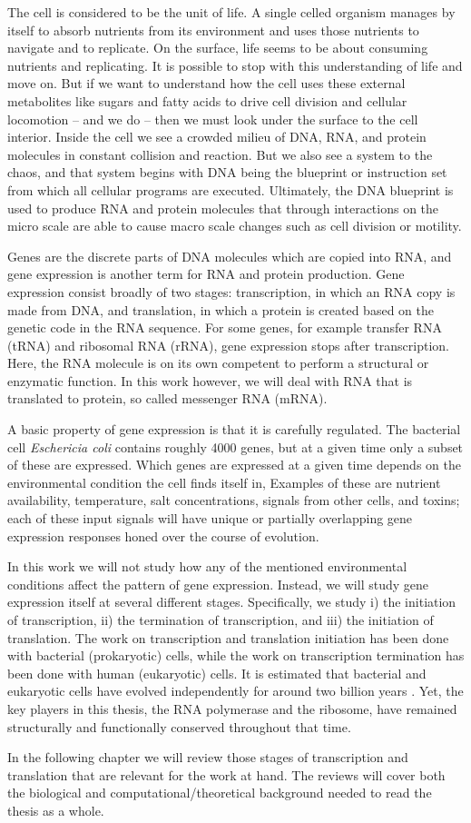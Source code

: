 %

The cell is considered to be the unit of life. A single celled organism manages
by itself to absorb nutrients from its environment and uses those nutrients to
navigate and to replicate. On the surface, life seems to be about
consuming nutrients and replicating. It is possible to stop with this
understanding of life and move on. But if we want to understand how the cell
uses these external metabolites like sugars and fatty acids to drive cell
division and cellular locomotion -- and we do -- then we must look under the
surface to the cell interior. Inside the cell we see a crowded milieu of DNA,
RNA, and protein molecules in constant collision and reaction. But we also see
a system to the chaos, and that system begins with DNA being the blueprint or
instruction set from which all cellular programs are executed. Ultimately, the
DNA blueprint is used to produce RNA and protein molecules that through
interactions on the micro scale are able to cause macro scale changes such as
cell division or motility.

Genes are the discrete parts of DNA molecules which are copied into RNA, and gene
expression is another term for RNA and protein production. Gene expression
consist broadly of two stages: transcription, in which an RNA copy is made
from DNA, and translation, in which a protein is created based on
the genetic code in the RNA sequence. For some genes, for example transfer RNA
(tRNA) and ribosomal RNA (rRNA), gene expression stops after transcription.
Here, the RNA molecule is on its own competent to perform a structural or
enzymatic function. In this work however, we will deal with RNA that is
translated to protein, so called messenger RNA (mRNA).

A basic property of gene expression is that it is carefully regulated. The
bacterial cell \textit{Eschericia coli} contains roughly 4000 genes, but at a
given time only a subset of these are expressed. Which genes are expressed at a
given time depends on the environmental condition the cell finds itself in,
Examples of these are nutrient availability, temperature, salt concentrations,
signals from other cells, and toxins; each of these input signals will have
unique or partially overlapping gene expression responses honed over the
course of evolution.

In this work we will not study how any of the mentioned environmental
conditions affect the pattern of gene expression. Instead, we will study gene
expression itself at several different stages. Specifically, we study i) the
initiation of transcription, ii) the termination of transcription, and iii) the
initiation of translation. The work on transcription and translation initiation
has been done with bacterial (prokaryotic) cells, while the work on
transcription termination has been done with human (eukaryotic) cells. It is
estimated that bacterial and eukaryotic cells have evolved independently for
around two billion years \cite{vellai_origin_1999}. Yet, the key players in
this thesis, the RNA polymerase and the ribosome, have remained structurally
and functionally conserved throughout that time.

In the following chapter we will review those stages of transcription and
translation that are relevant for the work at hand. The reviews will cover both
the biological and computational/theoretical background needed to read the
thesis as a whole.
